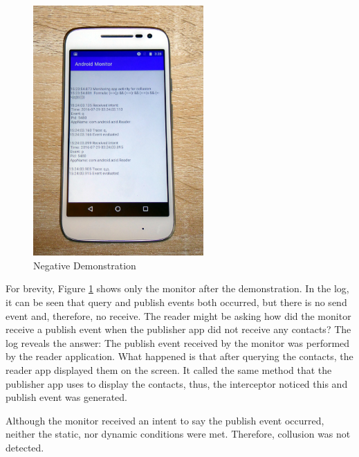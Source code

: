 \begin{figure}
	\centering
	\vspace{-12pt}
	\includegraphics[width=0.58\textwidth]{graphics/PhonePhotos/11 - NegativeTest.jpg}
	\caption{Negative Demonstration}
	\label{fig:NegativeDemonstration}
\end{figure}

For brevity, Figure \ref{fig:NegativeDemonstration} shows only the monitor after the demonstration.  In the log, it can be seen that query and publish events both occurred, but there is no send event and, therefore, no receive.  The reader might be asking how did the monitor receive a publish event when the publisher app did not receive any contacts?  The log reveals the answer:  The publish event received by the monitor was performed by the reader application.  What happened is that after querying the contacts, the reader app displayed them on the screen.  It called the same method that the publisher app uses to display the contacts, thus, the interceptor noticed this and publish event was generated.  

Although the monitor received an intent to say the publish event occurred, neither the static, nor dynamic conditions were met.  Therefore, collusion was not detected.
